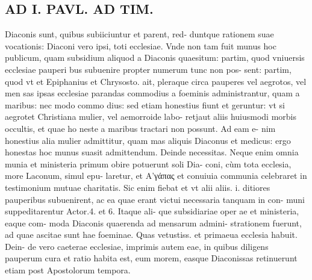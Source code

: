 \documentclass{article}
\begin{document}
\begin{pages}
\section*{AD I. PAVL. AD TIM. }
\marginpar{[ p.272 ]}\pstart Diaconis sunt, quibus subiiciuntur et parent, red- duntque rationem suae vocationis: Diaconi vero ipsi, toti ecclesiae. Vnde non tam fuit munus hoc publicum, quam subsidium aliquod a Diaconis quaesitum: partim, quod vniuersis ecclesiae pauperi bus subuenire propter numerum tunc non pos- sent: partim, quod vt et Epiphanius et Chrysosto. ait, pleraque circa pauperes vel aegrotos, vel men sas ipsas ecclesiae parandas commodius a foeminis administrantur, quam a maribus: nec modo commo dius: sed etiam honestius fiunt et geruntur: vt si aegrotet Christiana mulier, vel aemorroide labo- retjaut aliis huiusmodi morbis occultis, et quae ho neste a maribus tractari non possunt. Ad eam e- nim honestius alia mulier admittitur, quam mas aliquis Diaconus et medicus: ergo honestas hoc munus suasit admittendum.  \pend\pstart Deinde necessitas. Neque enim omnia munia et ministeria primum obire potuerunt soli Dia- coni, cùm tota ecclesia, more Laconum, simul epu- laretur, et Α’γάπας et conuiuia communia celebraret in testimonium mutuae charitatis. Sic enim fiebat et vt alii aliis. i. ditiores pauperibus subuenirent, ac ea quae erant victui necessaria tanquam in con- muni suppeditarentur Actor.4. et 6. Itaque ali- que subsidiariae oper ae et ministeria, eaque com- moda Diaconis quaerenda ad mensarum admini- strationem fuerunt, ad quae ascitae sunt hae foeminae. Quas vetustiss. et primaeua ecclesia habuit. Dein- de vero caeterae ecclesiae, imprimis autem eae, in quibus diligens pauperum cura et ratio habita est, eum morem, easque Diaconissas retinuerunt etiam post Apostolorum tempora.  \pend

\end{pages}
\end{document}
